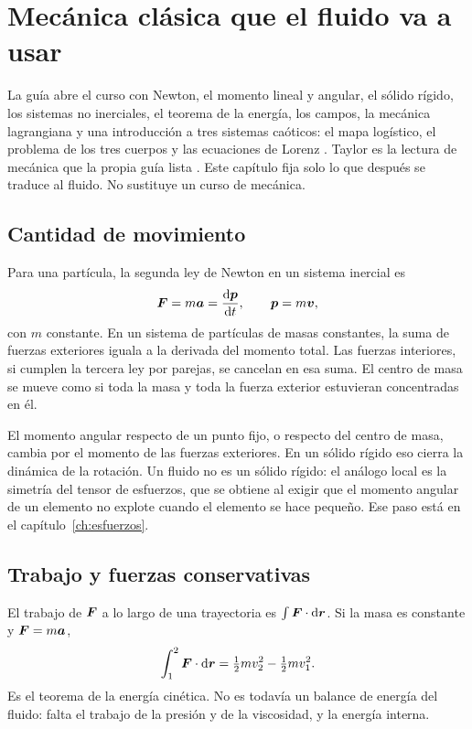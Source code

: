 \chapter{Mecánica clásica que el fluido va a usar}
\label{ch:clasica}

La guía abre el curso con Newton, el momento lineal y angular, el sólido rígido, los sistemas no inerciales, el teorema de la energía, los campos, la mecánica lagrangiana y una introducción a tres sistemas caóticos: el mapa logístico, el problema de los tres cuerpos y las ecuaciones de Lorenz \parencite{uleGuia2026}. Taylor es la lectura de mecánica que la propia guía lista \parencite{taylor2005}. Este capítulo fija solo lo que después se traduce al fluido. No sustituye un curso de mecánica.

\section{Cantidad de movimiento}

Para una partícula, la segunda ley de Newton en un sistema inercial es
\begin{equation}
\label{eq:newton}
\boldsymbol{F}=m\boldsymbol{a}= \frac{\mathrm{d}\boldsymbol{p}}{\mathrm{d}t},
\qquad \boldsymbol{p}=m\boldsymbol{v},
\end{equation}
con \(m\) constante. En un sistema de partículas de masas constantes, la suma de fuerzas exteriores iguala a la derivada del momento total. Las fuerzas interiores, si cumplen la tercera ley por parejas, se cancelan en esa suma. El centro de masa se mueve como si toda la masa y toda la fuerza exterior estuvieran concentradas en él.

El momento angular respecto de un punto fijo, o respecto del centro de masa, cambia por el momento de las fuerzas exteriores. En un sólido rígido eso cierra la dinámica de la rotación. Un fluido no es un sólido rígido: el análogo local es la simetría del tensor de esfuerzos, que se obtiene al exigir que el momento angular de un elemento no explote cuando el elemento se hace pequeño. Ese paso está en el capítulo~\ref{ch:esfuerzos}.

\section{Trabajo y fuerzas conservativas}

El trabajo de \(\boldsymbol{F}\) a lo largo de una trayectoria es \(\int \boldsymbol{F}\cdot\mathrm{d}\boldsymbol{r}\). Si la masa es constante y \(\boldsymbol{F}=m\boldsymbol{a}\),
\[
\int_{1}^{2}\boldsymbol{F}\cdot\mathrm{d}\boldsymbol{r}=\tfrac12 mv_2^2-\tfrac12 mv_1^2.
\]
Es el teorema de la energía cinética. No es todavía un balance de energía del fluido: falta el trabajo de la presión y de la viscosidad, y la energía interna.

